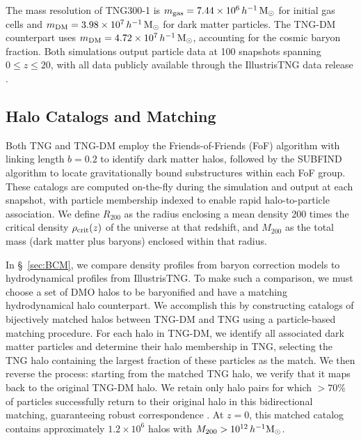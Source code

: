 \documentclass[linenumbers,trackchanges]{aastex701}
\begin{document}
The mass resolution of TNG300-1 is $m_{\rm gas}=7.44\times 10^6\,h^{-1}\,{\rm M}_\odot$ for initial gas cells and $m_{\rm DM}=3.98\times 10^7\,h^{-1}\,{\rm M}_\odot$ for dark matter particles. The TNG-DM counterpart uses $m_{\rm DM}=4.72\times 10^7\,h^{-1}\,{\rm M}_\odot$, accounting for the cosmic baryon fraction. Both simulations output particle data at 100 snapshots spanning $0 \leq z \leq 20$, with all data publicly available through the IllustrisTNG data release \citep{Nelson2019}.

\subsection{Halo Catalogs and Matching}
Both TNG and TNG-DM employ the Friends-of-Friends (FoF) algorithm with linking length $b=0.2$ to identify dark matter halos, followed by the SUBFIND algorithm \citep{Springel01} to locate gravitationally bound substructures within each FoF group. These catalogs are computed on-the-fly during the simulation and output at each snapshot, with particle membership indexed to enable rapid halo-to-particle association. We define $R_{200}$ as the radius enclosing a mean density 200 times the critical density $\rho_{\rm crit}(z)$ of the universe at that redshift, and $M_{200}$ as the total mass (dark matter plus baryons) enclosed within that radius.

In \S~\ref{sec:BCM}, we compare density profiles from baryon correction models to hydrodynamical profiles from IllustrisTNG. To make such a comparison, we must choose a set of DMO halos to be baryonified and have a matching hydrodynamical halo counterpart. We accomplish this by constructing catalogs of bijectively matched halos between TNG-DM and TNG using a particle-based matching procedure. For each halo in TNG-DM, we identify all associated dark matter particles and determine their halo membership in TNG, selecting the TNG halo containing the largest fraction of these particles as the match. We then reverse the process: starting from the matched TNG halo, we verify that it maps back to the original TNG-DM halo. We retain only halo pairs for which $> 70\%$ of particles successfully return to their original halo in this bidirectional matching, guaranteeing robust correspondence \citep{Knebe11}. At $z=0$, this matched catalog contains approximately $1.2\times 10^6$ halos with $M_{200} > 10^{12}\,h^{-1}{\rm M}_\odot$.
\end{document}
